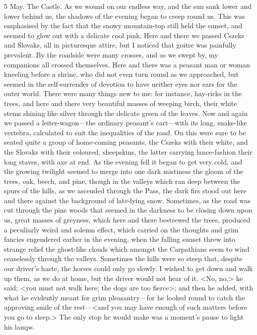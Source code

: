 \begin{diary}{5 May. The Castle.}
As we wound on our endless way, and the sun sank lower and lower behind us, the shadows of the evening began to creep round us. This was emphasised by the fact that the snowy mountain-top still held the sunset, and seemed to glow out with a delicate cool pink. Here and there we passed Cszeks and Slovaks, all in picturesque attire, but I noticed that goitre was painfully prevalent. By the roadside were many crosses, and as we swept by, my companions all crossed themselves. Here and there was a peasant man or woman kneeling before a shrine, who did not even turn round as we approached, but seemed in the self-surrender of devotion to have neither eyes nor ears for the outer world. There were many things new to me: for instance, hay-ricks in the trees, and here and there very beautiful masses of weeping birch, their white stems shining like silver through the delicate green of the leaves. Now and again we passed a leiter-wagon—the ordinary peasant's cart—with its long, snake-like vertebra, calculated to suit the inequalities of the road. On this were sure to be seated quite a group of home-coming peasants, the Cszeks with their white, and the Slovaks with their coloured, sheepskins, the latter carrying lance-fashion their long staves, with axe at end. As the evening fell it began to get very cold, and the growing twilight seemed to merge into one dark mistiness the gloom of the trees, oak, beech, and pine, though in the valleys which ran deep between the spurs of the hills, as we ascended through the Pass, the dark firs stood out here and there against the background of late-lying snow. Sometimes, as the road was cut through the pine woods that seemed in the darkness to be closing down upon us, great masses of greyness, which here and there bestrewed the trees, produced a peculiarly weird and solemn effect, which carried on the thoughts and grim fancies engendered earlier in the evening, when the falling sunset threw into strange relief the ghost-like clouds which amongst the Carpathians seem to wind ceaselessly through the valleys. Sometimes the hills were so steep that, despite our driver's haste, the horses could only go slowly. I wished to get down and walk up them, as we do at home, but the driver would not hear of it. <No, no,> he said; <you must not walk here; the dogs are too fierce>; and then he added, with what he evidently meant for grim pleasantry—for he looked round to catch the approving smile of the rest—<and you may have enough of such matters before you go to sleep.> The only stop he would make was a moment's pause to light his lamps.


\end{diary}
